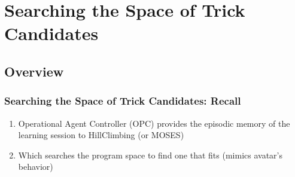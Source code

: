 \documentclass{beamer}
\begin{document}
\section{Searching the Space of Trick Candidates}

\subsection{Overview}

\frame
{
  \frametitle{Searching the Space of Trick Candidates: Recall}

  \begin{enumerate}
  \item<+-> Operational Agent Controller (OPC) \alert{provides}
    the \alert{episodic memory
    of the learning session} to HillClimbing (or MOSES)
  \item<+-> Which \alert{searches
    the program space} to find one that fits (\alert{mimics avatar's behavior})
  \end{enumerate}

  \begin{columns}
    \column{1.5in}
    
    \column{2in}
  \end{columns}

}
\end{document}
